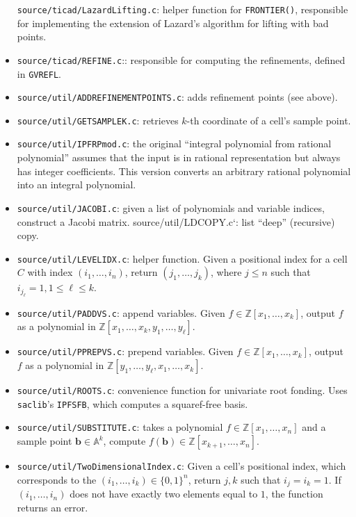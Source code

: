 \documentclass[
]{book}
\theoremstyle{definition}
\theoremstyle{definition}
\theoremstyle{definition}
\theoremstyle{definition}
\theoremstyle{remark}
\begin{document}
\begin{itemize}
  \texttt{source/ticad/LazardLifting.c}: helper function for \texttt{FRONTIER()}, responsible for implementing the extension of Lazard's algorithm for lifting with bad points.
\item
  \texttt{source/ticad/REFINE.c}:: responsible for computing the refinements, defined in \texttt{GVREFL}.
\item
  \texttt{source/util/ADDREFINEMENTPOINTS.c}: adds refinement points (see above).
\item
  \texttt{source/util/GETSAMPLEK.c}: retrieves \(k\)-th coordinate of a cell's sample point.
\item
  \texttt{source/util/IPFRPmod.c}: the original ``integral polynomial from rational polynomial'' assumes that the input is in rational representation but always has integer coefficients. This version converts an arbitrary rational polynomial into an integral polynomial.
\item
  \texttt{source/util/JACOBI.c}: given a list of polynomials and variable indices, construct a Jacobi matrix.
  \texttt{}source/util/LDCOPY.c`: list ``deep'' (recursive) copy.
\item
  \texttt{source/util/LEVELIDX.c}: helper function. Given a positional index for a cell \(C\) with index \((i_1,\ldots,i_n)\), return \((j_1,\ldots,j_k)\), where \(j\le n\) such that \(i_{j_\ell} = 1, 1 \le \ell \le k\).
\item
  \texttt{source/util/PADDVS.c}: append variables. Given \(f \in \mathbb{Z}[x_1,\ldots,x_k]\), output \(f\) as a polynomial in \(\mathbb{Z}[x_1,\ldots,x_k,y_1,\ldots,y_\ell]\).
\item
  \texttt{source/util/PPREPVS.c}: prepend variables. Given \(f \in \mathbb{Z}[x_1,\ldots,x_k]\), output \(f\) as a polynomial in \(\mathbb{Z}[y_1,\ldots,y_\ell,x_1,\ldots,x_k]\).
\item
  \texttt{source/util/ROOTS.c}: convenience function for univariate root fonding. Uses \texttt{saclib}'s \texttt{IPFSFB}, which computes a squaref-free basis.
\item
  \texttt{source/util/SUBSTITUTE.c}: takes a polynomial \(f \in \mathbb{Z}[x_1,\ldots,x_n]\) and a sample point \(\mathbf{b} \in \mathbb{A}^k\), compute \(f(\mathbf{b}) \in \mathbb{Z}[x_{k+1},\ldots,x_n]\).
\item
  \texttt{source/util/TwoDimensionalIndex.c}: Given a cell's positional index, which corresponds to the \((i_1,\ldots,i_k) \in \{0,1\}^n\), return \(j,k\) such that \(i_j = i_k = 1\). If \((i_1,\ldots,i_n)\) does not have exactly two elements equal to \(1\), the function returns an error.
\end{itemize}
\end{document}
